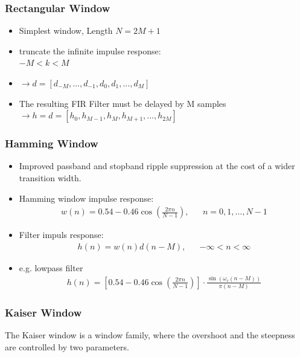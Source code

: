 \subsubsection{Rectangular Window}
\begin{multicols}{2}
	\begin{itemize}
		\item Simplest window, Length $N = 2M+1$
		\item truncate the infinite impulse response: \\ $-M < k < M$
		\item $\rightarrow d = [d_{-M}, ..., d_{-1}, d_0, d_1, ..., d_M]$
		\item The resulting FIR Filter must be delayed by M samples \newline
		$\rightarrow h = d = [h_0, h_{M-1}, h_M, h_{M+1}, ..., h_{2M}]$
	\end{itemize}
	
	\begin{center}
		
	\end{center}
\end{multicols}

\subsubsection{Hamming Window}
\begin{itemize}
	\item Improved passband and stopband ripple suppression at the cost of a wider transition width.
	\item Hamming window impulse response:
	\begin{align*}
		w(n) = 0.54 -0.46\cos\left(\frac{2\pi n}{N-1}\right),&&n= 0,1,\dots,N-1
	\end{align*}
	\item Filter impuls response:
	\begin{align*}
		h(n) = w(n)d(n-M),&&-\infty < n < \infty
	\end{align*}
	\item e.g. lowpass filter
	\begin{align*}
		h(n) = \left[0.54 -0.46\cos\left(\frac{2\pi n}{N-1}\right)\right]\cdot\frac{\sin(\omega_c(n-M))}{\pi (n-M)}
	\end{align*}
\end{itemize}

\newpage
\subsubsection{Kaiser Window}
The Kaiser window is a window family, where the overshoot and the steepness
are controlled by two parameters. \\

